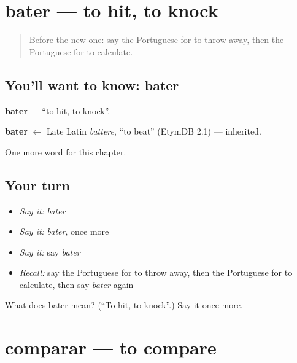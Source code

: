 \section[bater]{bater — to hit, to knock}

\label{lesson:PT-C204-bater}



\begin{quote}
Before the new one: say the Portuguese for to throw away, then the Portuguese for to calculate.
\end{quote}

\subsection*{You'll want to know: bater}
\textbf{bater} — \textquotedblleft{}to hit, to knock\textquotedblright{}.

\begin{cousinweb}
\textbf{bater} $\leftarrow$ Late Latin \emph{battere}, \textquotedblleft{}to beat\textquotedblright{} (EtymDB 2.1) — inherited.
\end{cousinweb}

\begin{grammarlens}[title={What you've built}]
One more word for this chapter.
\end{grammarlens}

\subsection*{Your turn}
\begin{itemize}
\raggedright
  \item \emph{Say it:} \emph{bater}
  \item \emph{Say it:} \emph{bater}, once more
  \item \emph{Say it:} say \emph{bater}
  \item \emph{Recall:} say the Portuguese for to throw away, then the Portuguese for to calculate, then say \emph{bater} again
\end{itemize}

\begin{tcolorbox}[breakable,colback=teal!4,colframe=teal!35!black,title={Before you move on}]
What does bater mean? (\textquotedblleft{}To hit, to knock\textquotedblright{}.) Say it once more.
\end{tcolorbox}
\section[comparar]{comparar — to compare}

